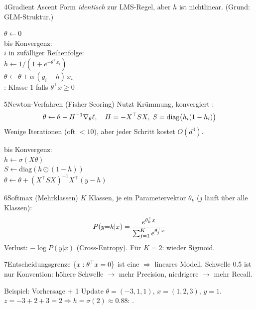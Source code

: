 \begin{hngrid}
\begin{hnp}[raster multicolumn=3,acc=hnnavy]{4}{Gradient Ascent}
Form \emph{identisch} zur LMS-Regel, aber $h$ ist nichtlinear. (Grund: GLM-Struktur.)
\begin{pcode}
 $\theta\leftarrow 0$\\
 bis Konvergenz:\\
\hii {} $i$ in zufälliger Reihenfolge:\\
\hiii $h\leftarrow 1/(1+e^{-\theta^{\top}x_i})$\\
\hiii $\theta\leftarrow\theta+\alpha\,(y_i-h)\,x_i$\\
: Klasse 1 falls $\theta^{\top}x\ge 0$
\end{pcode}
\end{hnp}
%
\begin{hnp}[raster multicolumn=3,acc=hngreen]{5}{Newton-Verfahren (Fisher Scoring)}
Nutzt Krümmung, konvergiert :
\[ \theta\leftarrow\theta-H^{-1}\nabla_\theta\ell,\quad H=-X^{\top} SX,\; S=\mathrm{diag}\bigl(h_i(1-h_i)\bigr) \]
Wenige Iterationen (oft $<10$), aber jeder Schritt kostet $O(d^3)$.
\begin{pcode}
 bis Konvergenz:\\
\hii $h\leftarrow\sigma(X\theta)$\\
\hii $S\leftarrow\mathrm{diag}(h\odot(1-h))$\\
\hii $\theta\leftarrow\theta+(X^{\top}SX)^{-1}X^{\top}(y-h)$
\end{pcode}
\end{hnp}
%
\begin{hnp}[raster multicolumn=2,acc=hnrose]{6}{Softmax (Mehrklassen)}
$K$ Klassen, je ein Parametervektor $\theta_k$ ($j$ läuft über alle Klassen):
\[ P(y{=}k|x)=\frac{e^{\theta_k^{\top} x}}{\sum_{j=1}^{K}e^{\theta_j^{\top} x}} \]
Verlust: $-\log P(y|x)$ (Cross-Entropy). Für $K=2$: wieder Sigmoid.
\end{hnp}
%
\begin{hnp}[raster multicolumn=2,acc=hnpurple]{7}{Entscheidungsgrenze}
$\{x:\theta^{\top} x=0\}$ ist eine  $\Rightarrow$ lineares Modell. Schwelle 0.5 ist nur Konvention: höhere Schwelle $\to$ mehr Precision, niedrigere $\to$ mehr Recall.
\end{hnp}
%
\begin{hnex}[raster multicolumn=2]{Beispiel: Vorhersage + 1 Update}
$\theta=(-3,1,1)$, $x=(1,2,3)$, $y=1$.\\
$z=-3+2+3=2\Rightarrow h=\sigma(2)\approx0.88$: .\\

\end{hnex}
\end{hngrid}
